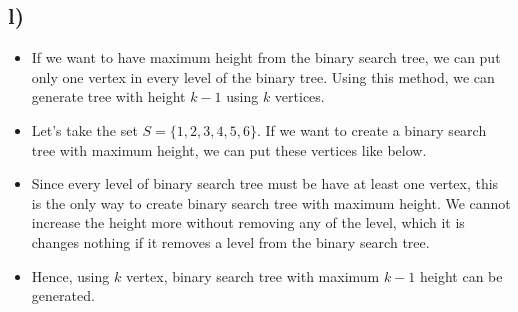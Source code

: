 \documentclass[11pt]{article}
\begin{document}
\subsection*{l)}
    \begin{itemize}
        \item If we want to have maximum height from the binary search tree, we can put only one vertex in every level of the binary tree. Using this method, we can generate tree with height $k - 1$ using $k$ vertices.
        \item Let's take the set $S = \{1, 2, 3, 4, 5, 6\}$. If we want to create a binary search tree with maximum height, we can put these vertices like below.
        
        \begin{figure}[H]
        	\centering
        \end{figure}
        \item Since every level of binary search tree must be have at least one vertex, this is the only way to create binary search tree with maximum height. We cannot increase the height more without removing any of the level, which it is changes nothing if it removes a level from the binary search tree.
        \item Hence, using $k$ vertex, binary search tree with maximum $k-1$ height can be generated.
    \end{itemize}{}
\end{document}
